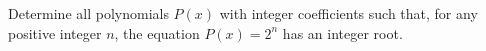 Determine all polynomials $P(x)$ with integer coefficients such that, for any positive integer $n$, the equation $P(x)=2^n$ has an integer root.